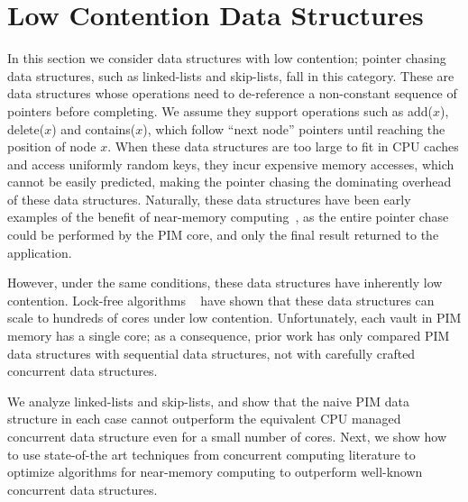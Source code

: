 
\section{Low Contention Data Structures}
\label{section:pointer_chasing}

In this section we consider data structures with low contention; pointer chasing data structures, 
such as linked-lists and skip-lists, fall in this category.  
These are data structures whose operations  
need to de-reference a non-constant sequence of pointers before completing. We assume they support operations 
such as add($x$), delete($x$) and contains($x$), which follow ``next node'' pointers until 
reaching the position of node $x$.
When these data structures are too large to fit in CPU caches 
and access uniformly random keys,
they incur expensive memory accesses, which cannot
be easily predicted, making the pointer chasing the dominating overhead of these data structures.
Naturally, these data structures have been early examples of the benefit of near-memory 
computing~\cite{hsieh2016accelerating}, as the entire pointer chase could be performed by the PIM core, and only the final result returned to 
the application. 

However, under the same conditions, these data structures have inherently low contention. 
Lock-free algorithms
~\cite{practicallf, skiplists-concpugh, valois, Herlihy08}
have shown that these data structures can scale to hundreds of cores under low contention. Unfortunately, each vault in 
PIM memory has a single core; as a consequence, prior work 
has only compared PIM data structures with sequential data structures, 
not with carefully crafted concurrent data structures.

We analyze linked-lists and skip-lists, and show that the naive PIM data structure in each case cannot 
outperform the equivalent CPU managed concurrent data structure even for a small number of cores. Next, 
we show how to use state-of-the art techniques from concurrent computing literature to 
optimize algorithms for near-memory computing to outperform well-known concurrent data 
structures. 

